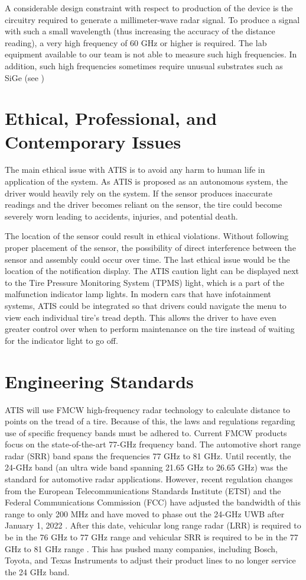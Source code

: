 \documentclass[11pt]{IEEEtran}
\begin{document}
		A considerable design constraint with respect to production of the device is the circuitry required to generate a millimeter-wave radar signal. To produce a signal with such a small wavelength (thus increasing the accuracy of the distance reading), a very high frequency of 60 GHz or higher is required. The lab equipment available to our team is not able to measure such high frequencies. In addition, such high frequencies sometimes require unusual substrates such as SiGe (see \cite{122ghz,240ghz})


	\section{Ethical, Professional, and Contemporary Issues}
		The main ethical issue with ATIS is to avoid any harm to human life in application of the system. As ATIS is proposed as an autonomous system, the driver would heavily rely on the system. If the sensor produces inaccurate readings and the driver becomes reliant on the sensor, the tire could become severely worn leading to accidents, injuries, and potential death. 

		The location of the sensor could result in ethical violations. Without following proper placement of the sensor, the possibility of direct interference between the sensor and assembly could occur over time. The last ethical issue would be the location of the notification display. The ATIS caution light can be displayed next to the Tire Pressure Monitoring System (TPMS) light, which is a part of the malfunction indicator lamp lights. In modern cars that have infotainment systems, ATIS could be integrated so that drivers could navigate the menu to view each individual tire's tread depth. This allows the driver to have even greater control over when to perform maintenance on the tire instead of waiting for the indicator light to go off.


	\section{Engineering Standards}
		ATIS will use FMCW high-frequency radar technology to calculate distance to points on the tread of a tire. Because of this, the laws and regulations regarding use of specific frequency bands must be adhered to. Current FMCW products focus on the state-of-the-art 77-GHz frequency band. The automotive short range radar (SRR) band spans the frequencies 77 GHz to 81 GHz. Until recently, the 24-GHz band (an ultra wide band spanning 21.65 GHz to 26.65 GHz) was the standard for automotive radar applications. However, recent regulation changes from the European Telecommunications Standards Institute (ETSI) and the Federal Communications  Commission (FCC) have adjusted the bandwidth of this range to only 200 MHz and have moved to phase out the 24-GHz UWB after January 1, 2022 \cite{etsi-reduced-24ghz}. After this date, vehicular long range radar (LRR) is required to be in the 76 GHz to 77 GHz range and vehicular SRR is required to be in the 77 GHz to 81 GHz range \cite{fcc-15-16,fcc-76-81,etsi-76-77,etsi-77-81}. This has pushed many companies, including Bosch, Toyota, and Texas Instruments \cite{ti-24-77} to adjust their product lines to no longer service the 24 GHz band.
\end{document}
